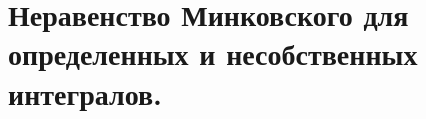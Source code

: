 \documentclass[../main.tex]{subfiles}
\begin{document}
\newpage
\section{Неравенство Минковского для определенных и несобственных интегралов.}
\end{document}
